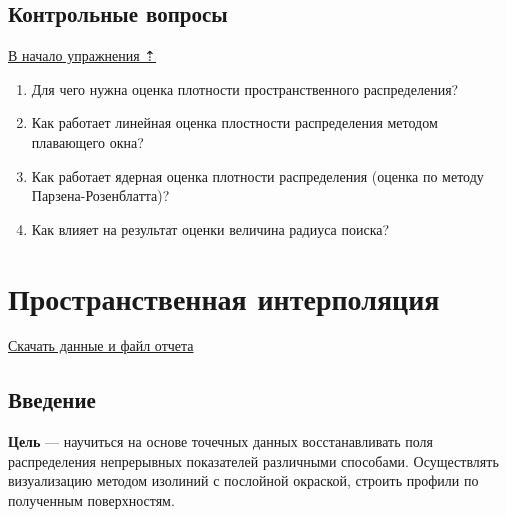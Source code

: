 \documentclass[]{book}
\theoremstyle{definition}
\theoremstyle{definition}
\theoremstyle{definition}
\theoremstyle{remark}
\begin{document}
\hypertarget{density-analysis-questions}{%
\section{Контрольные вопросы}\label{density-analysis-questions}}

\protect\hyperlink{density-analysis}{В начало упражнения ⇡}

\begin{enumerate}
\def\labelenumi{\arabic{enumi}.}
\item
  Для чего нужна оценка плотности пространственного распределения?
\item
  Как работает линейная оценка плостности распределения методом
  плавающего окна?
\item
  Как работает ядерная оценка плотности распределения (оценка по методу
  Парзена-Розенблатта)?
\item
  Как влияет на результат оценки величина радиуса поиска?
\end{enumerate}

\hypertarget{interpolation}{%
\chapter{Пространственная интерполяция}\label{interpolation}}

\href{http://autolab.geogr.msu.ru/gis/data/Ex17.zip}{Скачать данные и
файл отчета}

\hypertarget{interpolation-intro}{%
\section{Введение}\label{interpolation-intro}}

\textbf{Цель} --- научиться на основе точечных данных восстанавливать
поля распределения непрерывных показателей различными способами.
Осуществлять визуализацию методом изолиний с послойной окраской, строить
профили по полученным поверхностям.
\end{document}
